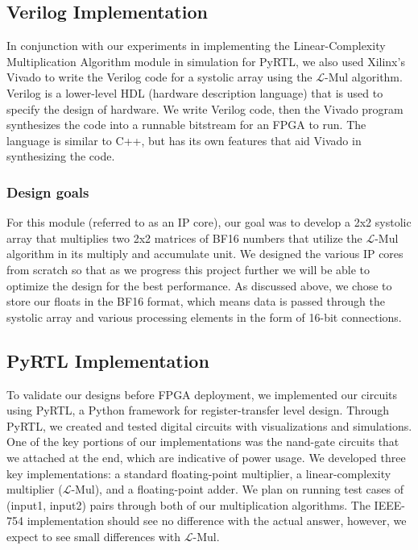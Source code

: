 \documentclass[12pt,letterpaper]{article}
\newcommand{\lmul}{$\mathcal{L}$-Mul\xspace}
\begin{document}
\subsection{Verilog Implementation}
In conjunction with our experiments in implementing the Linear-Complexity Multiplication Algorithm module in simulation for PyRTL, we also used Xilinx’s Vivado to write the Verilog code for a systolic array using the \lmul algorithm.  Verilog is a lower-level HDL (hardware description language) that is used to specify the design of hardware.  We write Verilog code, then the Vivado program synthesizes the code into a runnable bitstream for an FPGA to run.  The language is similar to C++, but has its own features that aid Vivado in synthesizing the code. 

\subsubsection*{Design goals}
For this module (referred to as an IP core), our goal was to develop a 2x2 systolic array that multiplies two 2x2 matrices of BF16 numbers that utilize the \lmul algorithm in its multiply and accumulate unit. We designed the various IP cores from scratch so that as we progress this project further we will be able to optimize the design for the best performance.  As discussed above, we chose to store our floats in the BF16 format, which means data is passed through the systolic array and various processing elements in the form of 16-bit connections.

\subsection{PyRTL Implementation}

To validate our designs before FPGA deployment, we implemented our circuits using PyRTL, a Python framework for register-transfer level design. Through PyRTL, we created and tested digital circuits with visualizations and simulations. One of the key portions of our implementations was the nand-gate circuits that we attached at the end, which are indicative of power usage. We developed three key implementations: a standard floating-point multiplier, a linear-complexity multiplier (\lmul), and a floating-point adder. We plan on running test cases of (input1, input2) pairs through both of our multiplication algorithms. The IEEE-754 implementation should see no difference with the actual answer, however, we expect to see small differences with \lmul.
\end{document}
